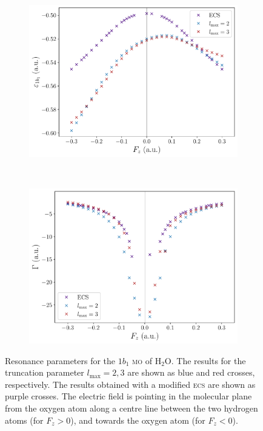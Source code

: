 \begin{figure}
  \centering
  \begin{subfigure}[b]{0.45\linewidth}
    \centering
    \includegraphics[width=\textwidth]{figures/ch_H2O/partial_wave/Re1b1l23.pdf}
    \caption{}\label{fig:1b1_cap_re}
  \end{subfigure}
  \,
  \begin{subfigure}[b]{0.45\linewidth}
    \centering
    \includegraphics[width=\textwidth]{figures/ch_H2O/partial_wave/Im1b1l23.pdf}
    \caption{}\label{fig:1b1_cap_im}
  \end{subfigure}
  \caption{Resonance parameters for the $1b_{1}$ \textsc{mo} of
    H$_{2}$O. The results for the truncation parameter
    $l_{\mathrm{max}} = 2, 3$ are shown as blue and red crosses,
    respectively. The results obtained with a modified \textsc{ecs}
    are shown as purple crosses. The electric field is pointing in the
    molecular plane from the oxygen atom along a centre line between
    the two hydrogen atoms (for $F_{z} > 0$), and towards the oxygen
    atom (for $F_{z} < 0$).}
  \label{fig:1b1_cap}
\end{figure}

